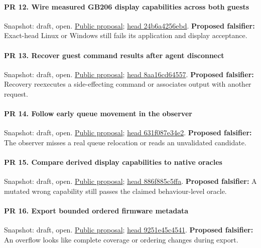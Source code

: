\paragraph{PR 12. Wire measured GB206 display capabilities across both guests}
\readcode Snapshot: draft, open.
\href{\repobase/pull/12}{Public proposal};
\href{\repobase/commit/24b6a4256ebdd4d806854696d417b93eddf34df4}{head 24b6a4256ebd}.
\textbf{Proposed falsifier:} Exact-head Linux or Windows still fails its application and display
  acceptance.

\paragraph{PR 13. Recover guest command results after agent disconnect}
\readcode Snapshot: draft, open.
\href{\repobase/pull/13}{Public proposal};
\href{\repobase/commit/8aa16cd645572dadeaca065091c6623e7f418540}{head 8aa16cd64557}.
\textbf{Proposed falsifier:} Recovery reexecutes a side-effecting command or associates output with
  another request.

\paragraph{PR 14. Follow early queue movement in the observer}
\readcode Snapshot: draft, open.
\href{\repobase/pull/14}{Public proposal};
\href{\repobase/commit/631f087e34e2e575f303835da9f11fedd3a97df6}{head 631f087e34e2}.
\textbf{Proposed falsifier:} The observer misses a real queue relocation or reads an unvalidated
  candidate.

\paragraph{PR 15. Compare derived display capabilities to native oracles}
\readcode Snapshot: draft, open.
\href{\repobase/pull/15}{Public proposal};
\href{\repobase/commit/886f885c5ffaa9cb49df6058b1b05af61c32371c}{head 886f885c5ffa}.
\textbf{Proposed falsifier:} A mutated wrong capability still passes the claimed behaviour-level
  oracle.

\paragraph{PR 16. Export bounded ordered firmware metadata}
\readcode Snapshot: draft, open.
\href{\repobase/pull/16}{Public proposal};
\href{\repobase/commit/9251e45c45410e62935a01b6e82b0c11a92b58a6}{head 9251e45c4541}.
\textbf{Proposed falsifier:} An overflow looks like complete coverage or ordering changes during
  export.

